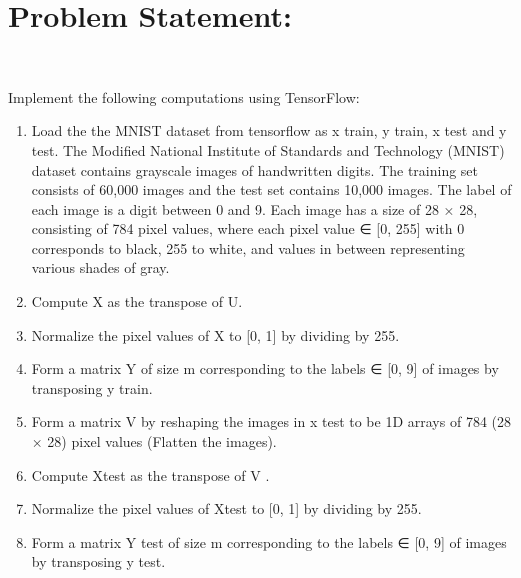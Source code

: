 


\section*{Problem Statement: } \\
\item Implement the following computations using TensorFlow:



\begin{enumerate}
    \item  Load the the MNIST dataset from tensorflow as x train, y train, x test and y test.
The Modified National Institute of Standards and Technology (MNIST) dataset
contains grayscale images of handwritten digits. The training set consists of 60,000
images and the test set contains 10,000 images. The label of each image is a digit
between 0 and 9. Each image has a size of 28 × 28, consisting of 784 pixel values,
where each pixel value ∈ [0, 255] with 0 corresponds to black, 255 to white, and
values in between representing various shades of gray.
    \item Compute X as the transpose of U.

    \item Normalize the pixel values of X to [0, 1] by dividing by 255.

    \item Form a matrix Y of size m corresponding to the labels ∈ [0, 9] of images by transposing y train.

    \item Form a matrix V by reshaping the images in x test to be 1D arrays of 784 (28 × 28)
pixel values (Flatten the images).

    \item Compute Xtest as the transpose of V .

    \item Normalize the pixel values of Xtest to [0, 1] by dividing by 255.

    \item Form a matrix Y test of size m corresponding to the labels ∈ [0, 9] of images by
transposing y test.


\end{enumerate}
